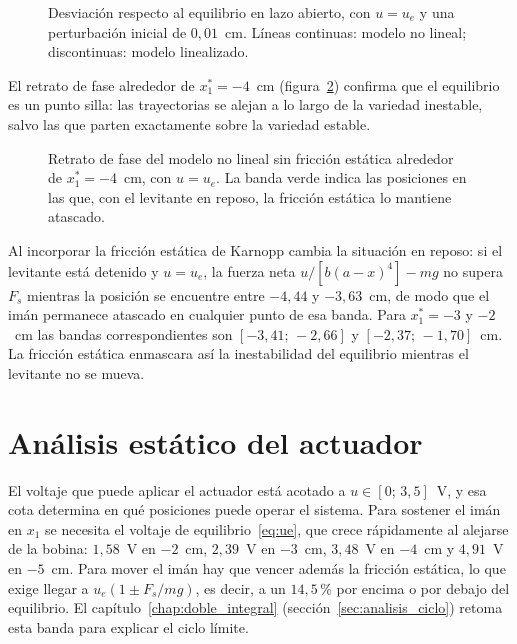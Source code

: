 \begin{figure}[ht]
    \centering
    
    \caption[Lazo abierto en los puntos de equilibrio]{Desviación respecto al equilibrio en lazo abierto, con $u=u_e$ y una perturbación inicial de $0{,}01$~cm. Líneas continuas: modelo no lineal; discontinuas: modelo linealizado.}
    \label{fig:p8_lazo_abierto}
\end{figure}

El retrato de fase alrededor de $x_1^*=-4$~cm (figura~\ref{fig:p8_retrato}) confirma que el equilibrio es un punto silla: las trayectorias se alejan a lo largo de la variedad inestable, salvo las que parten exactamente sobre la variedad estable.


\begin{figure}[ht]
    \centering
    
    \caption[Retrato de fase en lazo abierto]{Retrato de fase del modelo no lineal sin fricción estática alrededor de $x_1^*=-4$~cm, con $u=u_e$. La banda verde indica las posiciones en las que, con el levitante en reposo, la fricción estática lo mantiene atascado.}
    \label{fig:p8_retrato}
\end{figure}

Al incorporar la fricción estática de Karnopp cambia la situación en reposo: si el levitante está detenido y $u=u_e$, la fuerza neta $u/[b(a-x)^4]-mg$ no supera $F_s$ mientras la posición se encuentre entre $-4{,}44$ y $-3{,}63$~cm, de modo que el imán permanece atascado en cualquier punto de esa banda. Para $x_1^*=-3$ y $-2$~cm las bandas correspondientes son $[-3{,}41;\,-2{,}66]$ y $[-2{,}37;\,-1{,}70]$~cm. La fricción estática enmascara así la inestabilidad del equilibrio mientras el levitante no se mueva.

\FloatBarrier

\section{Análisis estático del actuador}\label{sec:actuador_estatico}

El voltaje que puede aplicar el actuador está acotado a $u\in[0;\,3{,}5]$~V, y esa cota determina en qué posiciones puede operar el sistema. Para sostener el imán en $x_1$ se necesita el voltaje de equilibrio~\eqref{eq:ue}, que crece rápidamente al alejarse de la bobina: $1{,}58$~V en $-2$~cm, $2{,}39$~V en $-3$~cm, $3{,}48$~V en $-4$~cm y $4{,}91$~V en $-5$~cm. Para mover el imán hay que vencer además la fricción estática, lo que exige llegar a $u_e(1\pm F_s/mg)$, es decir, a un $14{,}5$\,\% por encima o por debajo del equilibrio. El capítulo~\ref{chap:doble_integral} (sección~\ref{sec:analisis_ciclo}) retoma esta banda para explicar el ciclo límite.

